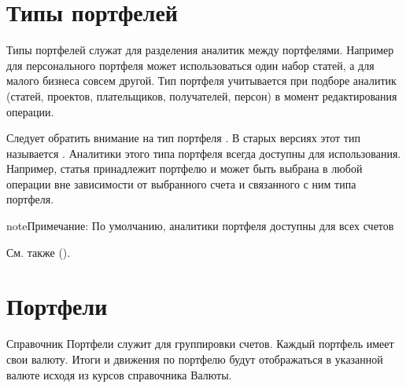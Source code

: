 \documentclass[a4paper,10pt,russian]{sphinxmanual}
\begin{document}
\noindent{}
\noindent{}


\section{Типы портфелей}
\label{\detokenize{directories:id2}}
\sphinxAtStartPar
Типы портфелей служат для разделения аналитик между портфелями. Например для персонального портфеля
может использоваться один набор статей, а для малого бизнеса совсем другой.
Тип портфеля учитывается при подборе аналитик (статей, проектов, плательщиков, получателей, персон) в
момент редактирования операции.

\noindent{}
\noindent{}
\noindent{}

\sphinxAtStartPar
Следует обратить внимание на тип портфеля . В старых версиях этот тип называется .
Аналитики этого типа портфеля всегда доступны для использования. Например, статья 
принадлежит портфелю  и может быть выбрана в любой операции вне зависимости от выбранного счета и
связанного с ним типа портфеля.

\begin{sphinxadmonition}{note}{Примечание:}
\sphinxAtStartPar
По умолчанию, аналитики портфеля  доступны для всех счетов
\end{sphinxadmonition}

\sphinxAtStartPar
См. также {\hyperref[\detokenize{shared-transactions:chapter-shared-transactions}]{}} ().


\section{Портфели}
\label{\detokenize{directories:id3}}
\sphinxAtStartPar
Справочник Портфели служит для группировки счетов. Каждый портфель имеет свои валюту. Итоги и движения по портфелю
будут отображаться в указанной валюте исходя из курсов справочника Валюты.
\end{document}
